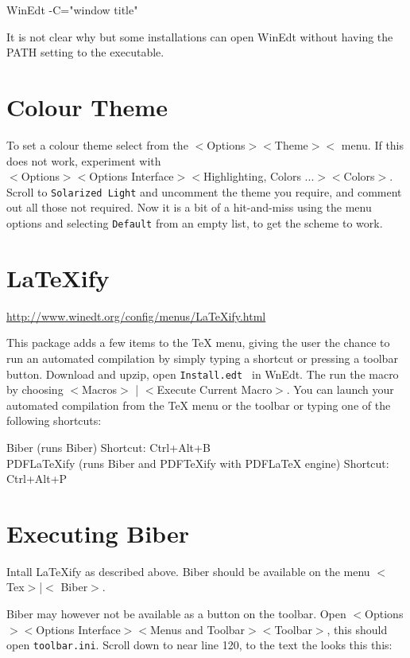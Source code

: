 WinEdt -C="window title"

It is not clear why but some installations can open WinEdt without having the PATH setting to the executable.

\section{Colour Theme}

To set a colour theme select from the
$<$Options$>$$<$Theme$>$$<$ menu.  If this does not work, experiment with \\
$<$Options$>$$<$Options Interface$>$$<$Highlighting, Colors ...$>$$<$Colors$>$. Scroll to \lstinline{Solarized Light} and uncomment the theme you require, and comment out all those not required.  Now it is a bit of a hit-and-miss using the menu options and selecting \lstinline{Default} from an empty list, to get the scheme to work.


\section{LaTeXify}

\url{http://www.winedt.org/config/menus/LaTeXify.html}

This package adds a few items to the TeX menu, giving the user the chance to run an automated compilation by simply typing a shortcut or pressing a toolbar button.  Download and upzip, open \lstinline{Install.edt } in WnEdt. The run the macro  by choosing $<$Macros$>$ | $<$Execute Current Macro$>$.  You can launch your automated compilation from the TeX menu or the toolbar or typing one of the following shortcuts:

Biber (runs Biber) Shortcut: Ctrl+Alt+B\\
PDFLaTeXify (runs Biber and PDFTeXify with PDFLaTeX engine) Shortcut: Ctrl+Alt+P

\section{Executing Biber}

Intall LaTeXify as described above. Biber should be available on the menu $<$ Tex$>$|$<$ Biber$>$.

Biber may however not be available as a button on the toolbar. Open
$<$Options$>$$<$Options Interface$>$$<$Menus and Toolbar$>$$<$Toolbar$>$, this should open \lstinline{toolbar.ini}. 
Scroll down to near line 120, to the text the looks this this:

